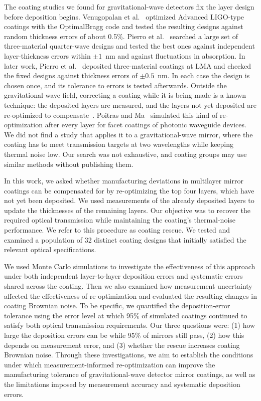 The coating studies we found for gravitational-wave detectors fix the layer design before deposition begins. Venugopalan et al.~\cite{Venugopalan2024} optimized Advanced LIGO-type coatings with the OptimalBragg code and tested the resulting designs against random thickness errors of about 0.5\%. Pierro et al.~\cite{Pierro2021} searched a large set of three-material quarter-wave designs and tested the best ones against independent layer-thickness errors within $\pm 1$~nm and against fluctuations in absorption. In later work, Pierro et al.~\cite{Pierro2026} deposited three-material coatings at LMA and checked the fixed designs against thickness errors of $\pm 0.5$~nm. In each case the design is chosen once, and its tolerance to errors is tested afterwards. Outside the gravitational-wave field, correcting a coating while it is being made is a known technique: the deposited layers are measured, and the layers not yet deposited are re-optimized to compensate~\cite{Sullivan1992,Wilbrandt2008,Melzig2024}. Poitras and Ma~\cite{Poitras2025} simulated this kind of re-optimization after every layer for facet coatings of photonic waveguide devices. We did not find a study that applies it to a gravitational-wave mirror, where the coating has to meet transmission targets at two wavelengths while keeping thermal noise low. Our search was not exhaustive, and coating groups may use similar methods without publishing them.

In this work, we asked whether manufacturing deviations in multilayer mirror coatings can be compensated for by re-optimizing the top four layers, which have not yet been deposited. We used measurements of the already deposited layers to update the thicknesses of the remaining layers. Our objective was to recover the required optical transmission while maintaining the coating's thermal-noise performance. We refer to this procedure as coating rescue. We tested and examined a population of 32 distinct coating designs that initially satisfied the relevant optical specifications.

We used Monte Carlo simulations to investigate the effectiveness of this approach under both independent layer-to-layer deposition errors and systematic errors shared across the coating. Then we also examined how measurement uncertainty affected the effectiveness of re-optimization and evaluated the resulting changes in coating Brownian noise. To be specific, we quantified the deposition-error tolerance using the error level at which 95\% of simulated coatings continued to satisfy both optical transmission requirements. Our three questions were: (1) how large the deposition errors can be while 95\% of mirrors still pass, (2) how this depends on measurement error, and (3) whether the rescue increases coating Brownian noise. Through these investigations, we aim to establish the conditions under which measurement-informed re-optimization can improve the manufacturing tolerance of gravitational-wave detector mirror coatings, as well as the limitations imposed by measurement accuracy and systematic deposition errors.
